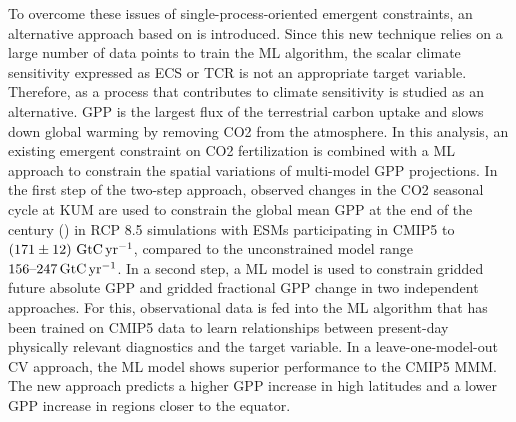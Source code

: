 To overcome these issues of single-process-oriented emergent constraints, an
alternative approach based on  is introduced. Since this new
technique relies on a large number of data points to train the \acs{ML}
algorithm, the scalar climate sensitivity expressed as \acs{ECS} or \acs{TCR}
is not an appropriate target variable. Therefore,  as a
process that contributes to climate sensitivity is studied as an alternative.
\acs{GPP} is the largest flux of the terrestrial carbon uptake and slows down
global warming by removing \acs{CO2} from the atmosphere. In this analysis, an
existing emergent constraint on \acs{CO2} fertilization is combined with a
\acs{ML} approach to constrain the spatial variations of multi-model \acs{GPP}
projections. In the first step of the two-step approach, observed changes in
the \acs{CO2} seasonal cycle at \acl{KUM} are used to constrain the global mean
\acs{GPP} at the end of the  century () in \acl{RCP}
8.5 simulations with \acsp{ESM} participating in \acs{CMIP}5 to
$\pmrangeunit{171}{12}{\GtCyr{}}$, compared to the unconstrained model range
$\rangeunit{156}{247}{\GtCyr{}}$. In a second step, a \acs{ML} model is used to
constrain gridded future absolute \acs{GPP} and gridded fractional \acs{GPP}
change in two independent approaches. For this, observational data is fed into
the \acs{ML} algorithm that has been trained on \acs{CMIP}5 data to learn
relationships between present-day physically relevant diagnostics and the
target variable. In a leave-one-model-out \acl{CV} approach, the \acs{ML} model
shows superior performance to the \acs{CMIP}5 \acs{MMM}. The new approach
predicts a higher \acs{GPP} increase in high latitudes and a lower \acs{GPP}
increase in regions closer to the equator.
